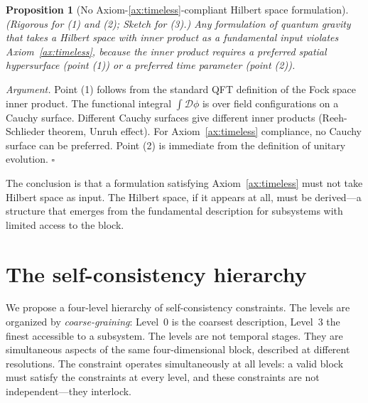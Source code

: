 \documentclass[12pt,a4paper]{article}
\newtheorem{proposition}{Proposition}
\theoremstyle{definition}
\theoremstyle{remark}
\begin{document}
\begin{proposition}[No Axiom-\ref{ax:timeless}-compliant Hilbert space formulation]
\emph{(Rigorous for (1) and (2); Sketch for (3).)}
\label{prop:nohilbert}
Any formulation of quantum gravity that takes a Hilbert space with inner product
as a fundamental input violates Axiom~\ref{ax:timeless}, because the inner
product requires a preferred spatial hypersurface (point (1)) or a preferred
time parameter (point (2)).
\end{proposition}

\noindent\emph{Argument.} Point (1) follows from the standard QFT definition of
the Fock space inner product. The functional integral $\int\mathcal{D}\phi$ is
over field configurations on a Cauchy surface. Different Cauchy surfaces give
different inner products (Reeh-Schlieder theorem, Unruh effect). For
Axiom~\ref{ax:timeless} compliance, no Cauchy surface can be preferred.
Point (2) is immediate from the definition of unitary evolution. \hfill$\square$

\medskip

The conclusion is that a formulation satisfying Axiom~\ref{ax:timeless} must
not take Hilbert space as input. The Hilbert space, if it appears at all, must
be derived---a structure that emerges from the fundamental description for
subsystems with limited access to the block.

\section{The self-consistency hierarchy}
\label{sec:hierarchy}

We propose a four-level hierarchy of self-consistency constraints. The levels
are organized by \emph{coarse-graining}: Level~0 is the coarsest description,
Level~3 the finest accessible to a subsystem. The levels are not temporal
stages. They are simultaneous aspects of the same four-dimensional block,
described at different resolutions. The constraint operates simultaneously at
all levels: a valid block must satisfy the constraints at every level, and these
constraints are not independent---they interlock.
\end{document}
